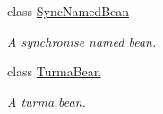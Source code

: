 \begin{DoxyCompactItemize}
class \hyperlink{class_cruzeiro_1_1_core_1_1_model_1_1_beans_1_1_sync_named_bean}{Sync\+Named\+Bean}
\begin{DoxyCompactList}\small\item\em A synchronise named bean. \end{DoxyCompactList}\item 
class \hyperlink{class_cruzeiro_1_1_core_1_1_model_1_1_beans_1_1_turma_bean}{Turma\+Bean}
\begin{DoxyCompactList}\small\item\em A turma bean. \end{DoxyCompactList}\end{DoxyCompactItemize}
